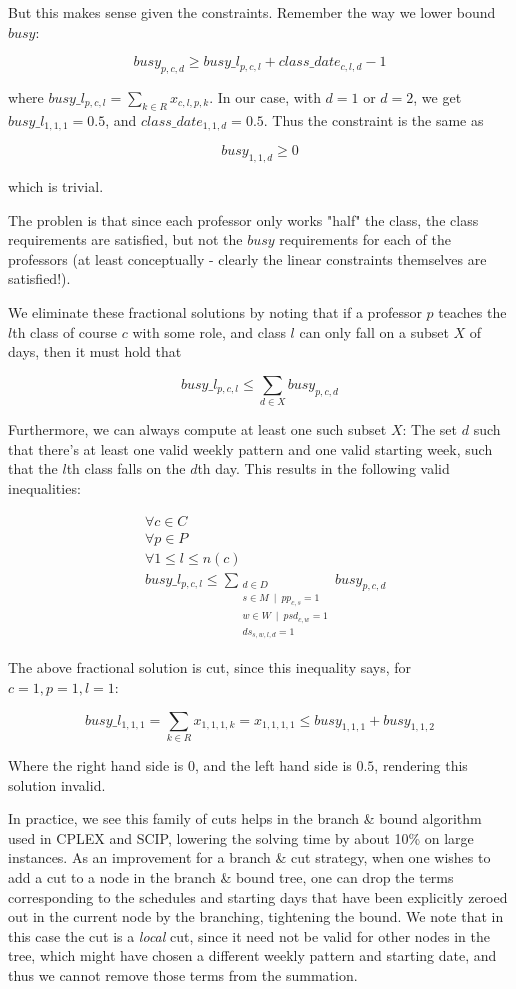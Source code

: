 But this makes sense given the constraints. Remember the way we lower bound $busy$:

$$
busy_{p, c, d} \ge busy\_l_{p, c, l} + class\_date_{c, l, d} - 1
$$

where $busy\_l_{p, c, l} = \sum_{k \in R} x_{c, l, p, k}$. In our case, with $d = 1$ or $d = 2$, we get $busy\_l_{1, 1, 1} = 0.5$, and $class\_date_{1, 1, d} = 0.5$. Thus the constraint is the same as

$$
busy_{1, 1, d} \ge 0
$$

\noindent which is trivial.

The problen is that since each professor only works "half" the class, the class requirements are satisfied, but not the $busy$ requirements for each of the professors (at least conceptually - clearly the linear constraints themselves are satisfied!). 

We eliminate these fractional solutions by noting that if a professor $p$ teaches the $l$th class of course $c$ with some role, and class $l$ can only fall on a subset $X$ of days, then it must hold that

$$
busy\_l_{p, c, l} \le \sum_{d \in X} busy_{p, c, d}
$$

Furthermore, we can always compute at least one such subset $X$: The set $d$ such that there's at least one valid weekly pattern and one valid starting week, such that the $l$th class falls on the $d$th day. This results in the following valid inequalities:

\begin{align*}
&\forall c \in C\\
&\forall p \in P\\
&\forall 1 \le l \le n(c)\\
&busy\_l_{p, c, l} \le \sum_{\substack{d \in D \\ s \in M\ \mid\ pp_{c, s} = 1\\ w \in W\ \mid\ psd_{c, w} = 1 \\ ds_{s, w, l, d} = 1}} busy_{p, c, d}
\end{align*}

The above fractional solution is cut, since this inequality says, for $c = 1, p = 1, l = 1$:

$$
busy\_l_{1, 1, 1} = \sum_{k \in R} x_{1, 1, 1, k} = x_{1, 1, 1, 1} \le busy_{1, 1, 1} + busy_{1, 1, 2}
$$

Where the right hand side is $0$, and the left hand side is $0.5$, rendering this solution invalid.

In practice, we see this family of cuts helps in the branch \& bound algorithm used in CPLEX\cite{CPLEX} and SCIP\cite{SCIP}, lowering the solving time by about 10\% on large instances. As an improvement for a branch \& cut strategy, when one wishes to add a cut to a node in the branch \& bound tree, one can drop the terms corresponding to the schedules and starting days that have been explicitly zeroed out in the current node by the branching, tightening the bound. We note that in this case the cut is a \emph{local} cut, since it need not be valid for other nodes in the tree, which might have chosen a different weekly pattern and starting date, and thus we cannot remove those terms from the summation.
